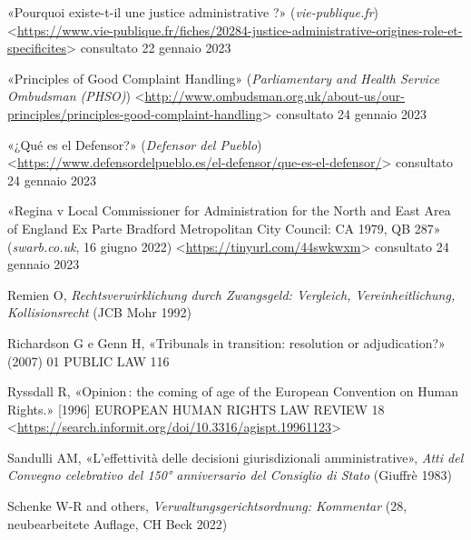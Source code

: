 \documentclass[12pt,it,a4paper,]{report}
\newlength{\cslhangindent}
\newenvironment{CSLReferences}[2] %
 {%
  \setlength{\parindent}{0pt}
  \ifodd #1 \everypar{\setlength{\hangindent}{\cslhangindent}}\ignorespaces\fi
  \ifnum #2 > 0
  \setlength{\parskip}{#2\baselineskip}
  \fi
 }%
 {}
\begin{document}
\begin{CSLReferences}{0}{0}
\leavevmode{}%
{«Pourquoi existe-t-il une justice administrative ?»}
(\emph{vie-publique.fr})
\textless{}\url{https://www.vie-publique.fr/fiches/20284-justice-administrative-origines-role-et-specificites}\textgreater{}
consultato 22 gennaio 2023

\leavevmode{}%
{«Principles of Good Complaint Handling»} (\emph{Parliamentary and
Health Service Ombudsman (PHSO)})
\textless{}\url{http://www.ombudsman.org.uk/about-us/our-principles/principles-good-complaint-handling}\textgreater{}
consultato 24 gennaio 2023

\leavevmode{}%
{«¿Qué es el Defensor?»} (\emph{Defensor del Pueblo})
\textless{}\url{https://www.defensordelpueblo.es/el-defensor/que-es-el-defensor/}\textgreater{}
consultato 24 gennaio 2023

\leavevmode{}%
{«Regina v Local Commissioner for Administration for the North and East
Area of England Ex Parte Bradford Metropolitan City Council: CA 1979, QB
287»} (\emph{swarb.co.uk}, 16 giugno 2022)
\textless{}\url{https://tinyurl.com/44swkwxm}\textgreater{} consultato
24 gennaio 2023

\leavevmode{}%
Remien O, \emph{Rechtsverwirklichung durch Zwangsgeld: Vergleich,
Vereinheitlichung, Kollisionsrecht} (JCB Mohr 1992)

\leavevmode{}%
Richardson G e Genn H, {«Tribunals in transition: resolution or
adjudication?»} (2007) 01 PUBLIC LAW 116

\leavevmode{}%
Ryssdall R, {«Opinion\,: the coming of age of the European Convention on
Human Rights.»} {[}1996{]} EUROPEAN HUMAN RIGHTS LAW REVIEW 18
\textless{}\url{https://search.informit.org/doi/10.3316/agispt.19961123}\textgreater{}

\leavevmode{}%
Sandulli AM, {«L'effettività delle decisioni giurisdizionali
amministrative»}, \emph{Atti del Convegno celebrativo del 150°
anniversario del Consiglio di Stato} (Giuffrè 1983)

\leavevmode{}%
Schenke W-R and others, \emph{Verwaltungsgerichtsordnung: Kommentar}
(28, neubearbeitete Auflage, CH Beck 2022)


\end{CSLReferences}
\end{document}
